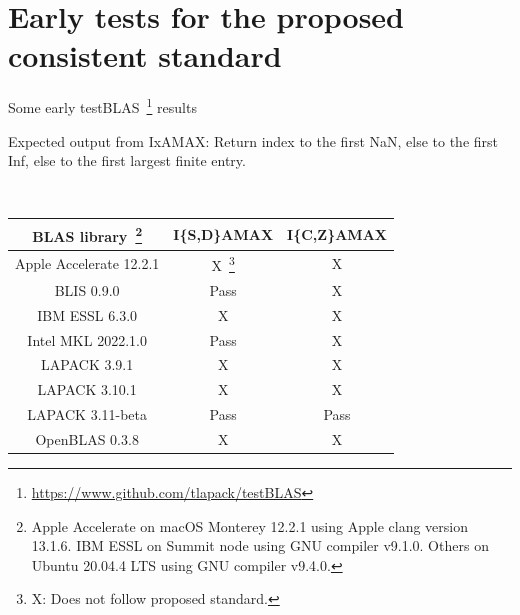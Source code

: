\documentclass[11pt]{beamer}
\begin{document}
\section{Early tests for the proposed consistent standard}

\begin{frame}{Some early testBLAS~\footnote{\url{https://www.github.com/tlapack/testBLAS}} results}

	Expected output from IxAMAX: Return index to the first NaN, else to the first Inf, else to the first largest finite entry.

	~\\
		\centering
		\begin{tabular}{|c|c|c|}
			\hline
			BLAS library~\footnote{Apple Accelerate on macOS Monterey 12.2.1 using Apple clang version 13.1.6. IBM ESSL on Summit node using GNU compiler v9.1.0. Others on Ubuntu 20.04.4 LTS using GNU compiler v9.4.0.} & I\{S,D\}AMAX & I\{C,Z\}AMAX \\\hline
			Apple Accelerate 12.2.1 & {X~\footnote{X: Does not follow proposed standard.}} & {X} \\\hline
			BLIS 0.9.0 & {\color{codegreen} Pass} & {X} \\\hline
			IBM ESSL 6.3.0 & {X} & {X} \\\hline
			Intel MKL 2022.1.0 & {\color{codegreen} Pass} & {X} \\\hline
			LAPACK 3.9.1 & {X} & {X} \\\hline
			LAPACK 3.10.1 & {X} & {X} \\\hline
			LAPACK 3.11-beta & {\color{codegreen} Pass} & {\color{codegreen} Pass} \\\hline
			OpenBLAS 0.3.8 & {X} & {X} \\\hline
		\end{tabular}

\end{frame}
\end{document}
